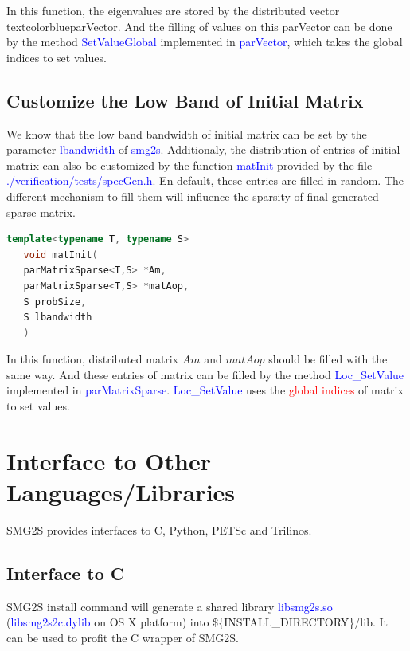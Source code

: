 \documentclass[a4paper, 10 pt]{report}
\begin{document}
In this function, the eigenvalues are stored by the distributed vector textcolor{blue}{parVector}. And the filling of values on this parVector can be done by  the method \textcolor{blue}{SetValueGlobal} implemented in \textcolor{blue}{parVector}, which takes the global indices to set values.

\section{Customize the Low Band of Initial Matrix}
We know that the low band bandwidth of initial matrix can be set by the parameter  \textcolor{blue}{lbandwidth} of \textcolor{blue}{smg2s}. Additionaly, the distribution of entries of initial matrix can also be customized by the function  \textcolor{blue}{matInit} provided by the file \textcolor{blue}{./verification/tests/specGen.h}. En default, these entries are filled in random. The different mechanism to fill them will influence the sparsity of final generated sparse matrix.

	\begin{lstlisting}[language=C++,frame=single]
   template<typename T, typename S>
   void matInit(
   parMatrixSparse<T,S> *Am, 
   parMatrixSparse<T,S> *matAop, 
   S probSize, 
   S lbandwidth
   )
\end{lstlisting}

In this function, distributed matrix $Am$ and $matAop$ should be filled with the same way. And these entries of matrix can be filled by the method \textcolor{blue}{Loc\_SetValue} implemented in \textcolor{blue}{parMatrixSparse}. \textcolor{blue}{Loc\_SetValue} uses the \textcolor{red}{global indices} of matrix to set values.

\newpage
	
	\chapter{Interface to Other Languages/Libraries}
	SMG2S provides interfaces to C, Python, PETSc and Trilinos.
	
	\section{Interface to C}
	SMG2S install command will generate a shared library \textcolor{blue}{libsmg2s.so} (\textcolor{blue}{libsmg2s2c.dylib} on OS X platform) into \$\{INSTALL\_DIRECTORY\}/lib. It can be used to profit the C wrapper of SMG2S. 
	
\end{document}
